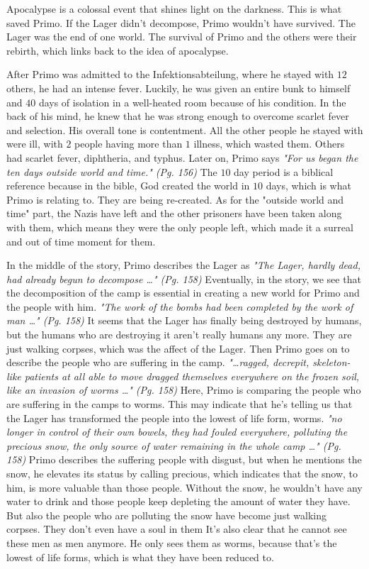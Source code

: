 Apocalypse is a colossal event that shines light on the darkness.
This is what saved Primo. If the Lager didn't decompose, Primo wouldn't have
survived. The Lager was the end of one world. The survival of Primo and the
others were their rebirth, which links back to the idea of apocalypse.

After Primo was admitted to the Infektionsabteilung, where he stayed with $12$
others, he had an intense fever. Luckily, he was given an entire bunk to
himself and $40$ days of isolation in a well-heated room because of his
condition. In the back of his mind, he knew that he was strong enough to
overcome scarlet fever and selection. His overall tone is contentment. All the
other people he stayed with were ill, with $2$ people having more than $1$
illness, which wasted them. Others had scarlet fever, diphtheria, and typhus.
Later on, Primo says \textit{"For us began the ten days outside world and
time." (Pg. 156)} The $10$ day period is a biblical reference because in the
bible, God created the world in $10$ days, which is what Primo is relating to.
They are being re-created. As for the "outside world and time" part, the Nazis
have left and the other prisoners have been taken along with them, which means
they were the only people left, which made it a surreal and out of time moment
for them.

In the middle of the story, Primo describes the Lager as \textit{"The Lager,
hardly dead, had already begun to decompose \ldots" (Pg. 158)} Eventually, in
the story, we see that the decomposition of the camp is essential in creating a
new world for Primo and the people with him. \textit{"The work of the bombs had
been completed by the work of man \ldots" (Pg. 158)} It seems that the Lager
has finally being destroyed by humans, but the humans who are destroying it
aren't really humans any more. They are just walking corpses, which was the
affect of the Lager. Then Primo goes on to describe the people who are
suffering in the camp. \textit{"\ldots ragged, decrepit, skeleton- like
patients at all able to move dragged themselves everywhere on the frozen soil,
like an invasion of worms \ldots" (Pg. 158)} Here, Primo is comparing the
people who are suffering in the camps to worms. This may indicate that he's
telling us that the Lager has transformed the people into the lowest of life
form, worms. \textit{"no longer in control of their own bowels, they had fouled
everywhere, polluting the precious snow, the only source of water remaining in
the whole camp \ldots" (Pg. 158)} Primo describes the suffering people with
disgust, but when he mentions the snow, he elevates its status by calling
precious, which indicates that the snow, to him, is more valuable than those
people. Without the snow, he wouldn't have any water to drink and those people
keep depleting the amount of water they have. But also the people who are
polluting the snow have become just walking corpses. They don't even have a
soul in them It's also clear that he cannot see these men as men anymore. He
only sees them as worms, because that's the lowest of life forms, which is what
they have been reduced to.

